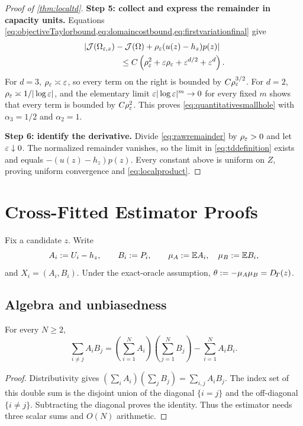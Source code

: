 \begin{proof}[Proof of \cref{thm:localtd}]
\textbf{Step 5: collect and express the remainder in capacity units.}
Equations \cref{eq:objectiveTaylorbound,eq:domaincostbound,eq:firstvariationfinal}
give
\begin{align}
 &\left|\J(\Omega_{\eps,z})-\J(\Omega)
 +\rho_\eps(u(z)-h_z)p(z)\right|\notag\\
 &\hspace{16mm}\le
 C\left(\rho_\eps^2+\eps\rho_\eps
        +\eps^{d/2}+\eps^d\right).
 \label{eq:rawremainder}
\end{align}
For $d=3$, $\rho_\varepsilon\asymp\varepsilon$, so every term on the right is bounded by
$C\rho_\varepsilon^{3/2}$.  For $d=2$,
$\rho_\varepsilon\asymp1/|\log\varepsilon|$, and the elementary limit
$\varepsilon|\log\varepsilon|^m\to0$ for every fixed $m$ shows that every term is bounded by
$C\rho_\varepsilon^2$.  This proves \cref{eq:quantitativesmallhole} with
$\alpha_3=1/2$ and $\alpha_2=1$.

\textbf{Step 6: identify the derivative.}
Divide \cref{eq:rawremainder} by $\rho_\varepsilon>0$ and let $\varepsilon\downarrow0$.
The normalized remainder vanishes, so the limit in
\cref{eq:tddefinition} exists and equals
$-(u(z)-h_z)p(z)$.  Every constant above is uniform on $Z$, proving uniform
convergence and \cref{eq:localproduct}.
\end{proof}
\section{Cross-Fitted Estimator Proofs}
\label{app:ustat}

Fix a candidate $z$.  Write
\begin{equation}
 A_i:=U_i-h_z,\qquad B_i:=P_i,
 \qquad \mu_A:=\mathbb{E} A_i,\quad\mu_B:=\mathbb{E} B_i,
\end{equation}
and $X_i=(A_i,B_i)$.  Under the exact-oracle assumption,
$\theta:=-\mu_A\mu_B=D_{\!T}(z)$.

\subsection{Algebra and unbiasedness}

\begin{lemma}
\label{lem:lineartime}
For every $N\ge2$,
\begin{equation}
 \sum_{i\ne j}A_iB_j
 =\left(\sum_{i=1}^NA_i\right)
  \left(\sum_{j=1}^NB_j\right)
  -\sum_{i=1}^NA_iB_i.
 \label{eq:lineartimeproof}
\end{equation}
\end{lemma}

\begin{proof}
Distributivity gives
$(\sum_iA_i)(\sum_jB_j)=\sum_{i,j}A_iB_j$.  The index set of this double sum
is the disjoint union of the diagonal $\{i=j\}$ and the off-diagonal
$\{i\ne j\}$.  Subtracting the diagonal proves the identity.  Thus the
estimator needs three scalar sums and $O(N)$ arithmetic.
\end{proof}

